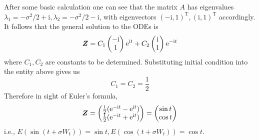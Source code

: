 \documentclass{homework}
\begin{document}
    \newcommand{\img}{\mathrm i}
    After some basic calculation one can see that the matrix $A$ has eigenvalues
    $\lambda_1=-\sigma^2/2+\img,\lambda_2=-\sigma^2/2-\img$, with eigenvectors $(-\img,1)^\mathrm T,(\img,1)^\mathrm T$
    accordingly. It follows that the general solution to the ODEs is
    \[\X=C_1\begin{pmatrix}
        -\img\\
        1
    \end{pmatrix}\e^{\img t}
    +C_2\begin{pmatrix}
        \img\\
        1
    \end{pmatrix}\e^{-\img t}\]
    where $C_1,C_2$ are constants to be determined.
    Substituting initial condition into the entity above gives us
    \[C_1=C_2=\frac{1}{2}\]
    Therefore in sight of Euler's formula,
    \[\X=\begin{pmatrix}
        \frac{\img}{2}(\e^{-\img t}-\e^{\img t})\\
        \frac{1}{2}(\e^{-\img t}+\e^{\img t})
    \end{pmatrix}
    =\begin{pmatrix}
        \sin t\\
        \cos t
    \end{pmatrix}\]
    i.e., $E(\sin(t+\sigma W_t))=\sin t,E(\cos(t+\sigma W_t))=\cos t$.
\end{document}
